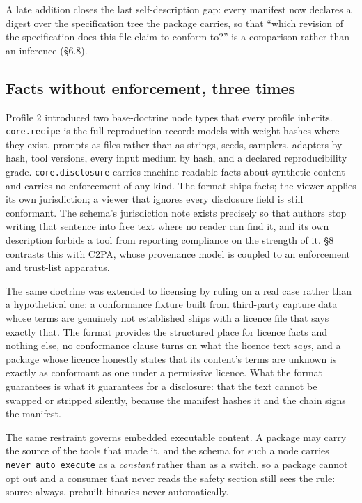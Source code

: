 \documentclass[10pt,twocolumn,letterpaper]{article}
\newcommand{\code}[1]{\texttt{\small #1}}
\begin{document}
A late addition closes the last self-description gap: every manifest now declares a digest over the specification tree the package carries, so that ``which revision of the specification does this file claim to conform to?'' is a comparison rather than an inference (\S6.8).

\subsection{Facts without enforcement, three times}

Profile 2 introduced two base-doctrine node types that every profile inherits. \code{core.recipe} is the full reproduction record: models with weight hashes where they exist, prompts as files rather than as strings, seeds, samplers, adapters by hash, tool versions, every input medium by hash, and a declared reproducibility grade. \code{core.disclosure} carries machine-readable facts about synthetic content and carries no enforcement of any kind. The format ships facts; the viewer applies its own jurisdiction; a viewer that ignores every disclosure field is still conformant. The schema's jurisdiction note exists precisely so that authors stop writing that sentence into free text where no reader can find it, and its own description forbids a tool from reporting compliance on the strength of it. \S8 contrasts this with C2PA, whose provenance model is coupled to an enforcement and trust-list apparatus.

The same doctrine was extended to licensing by ruling on a real case rather than a hypothetical one: a conformance fixture built from third-party capture data whose terms are genuinely not established ships with a licence file that says exactly that. The format provides the structured place for licence facts and nothing else, no conformance clause turns on what the licence text \emph{says}, and a package whose licence honestly states that its content's terms are unknown is exactly as conformant as one under a permissive licence. What the format guarantees is what it guarantees for a disclosure: that the text cannot be swapped or stripped silently, because the manifest hashes it and the chain signs the manifest.

The same restraint governs embedded executable content. A package may carry the source of the tools that made it, and the schema for such a node carries \code{never\_auto\_execute} as a \emph{constant} rather than as a switch, so a package cannot opt out and a consumer that never reads the safety section still sees the rule: source always, prebuilt binaries never automatically.
\end{document}
